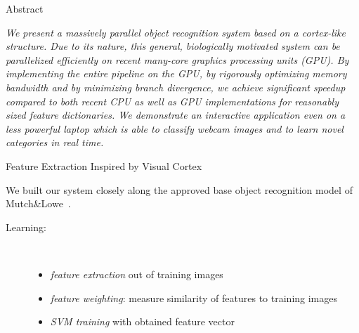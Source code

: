 \documentclass[final]{beamer}
\title[]{}
\author[]{Helmut Sedding, Ferdinand Deger, Holger Dammertz, Jan Bouecke, Hendrik P.\,A.\ Lensch}
\institute[]{Ulm University}
\date{}
\begin{document}
  \begin{frame}{}
  
    \begin{columns}[t]
        \begin{column}{.48\linewidth}
            \begin{block}{Abstract}

\emph{We present a massively parallel object recognition system based on a cortex-like structure. Due to its nature, this general, biologically motivated system can be parallelized efficiently on recent many-core graphics processing units (GPU). By implementing the entire pipeline on the GPU, by rigorously optimizing memory bandwidth and by minimizing branch divergence, we achieve significant speedup compared to both recent CPU as well as GPU implementations for reasonably sized feature dictionaries. We demonstrate an interactive application even on a less powerful laptop which is able to classify webcam images and to learn novel categories in real time.
}\newline
        \end{block}
        
        \begin{block} {Feature Extraction Inspired by Visual Cortex}
        
We built our system closely along the approved base object recognition model of
Mutch\&Lowe~\cite{mutch06}.

\begin{description}

\item[Learning:]~
\begin{itemize}
	\item  \emph{feature extraction} out of training images
	\item  \emph{feature weighting}: measure similarity of features to training images
	\item  \emph{SVM training} with obtained feature vector
\end{itemize}



\end{description}
\end{block}
\end{column}
\end{columns}
\end{frame}
\end{document}
